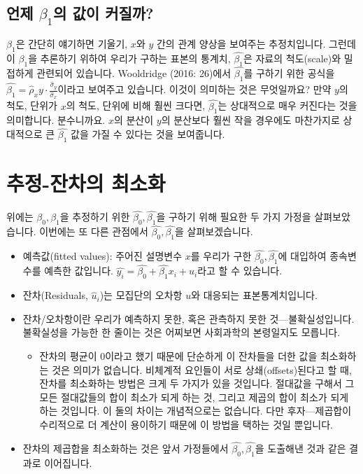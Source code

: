 \documentclass[
]{book}
\providecommand{\tightlist}{%
  \setlength{\itemsep}{0pt}\setlength{\parskip}{0pt}}
\begin{document}
\hypertarget{uxc5b8uxc81c-beta_1uxc758-uxac12uxc774-uxcee4uxc9c8uxae4c}{%
\subsection{\texorpdfstring{언제 \(\beta_1\)의 값이 커질까?}{언제 \textbackslash beta\_1의 값이 커질까?}}\label{uxc5b8uxc81c-beta_1uxc758-uxac12uxc774-uxcee4uxc9c8uxae4c}}

\(\beta_1\)은 간단히 얘기하면 기울기, \(x\)와 \(y\) 간의 관계 양상을 보여주는 추정치입니다. 그런데 이 \(\beta_1\)을 추론하기 위하여 우리가 구하는 표본의 통계치, \(\hat{\beta_1}\)은 자료의 척도(scale)와 밀접하게 관련되어 있습니다. Wooldridge (2016: 26)에서 \(\hat{\beta_1}\)를 구하기 위한 공식을 \(\hat{\beta_1} = \hat{\rho}_xy\cdot \frac{\hat{\sigma}_y}{\hat{\sigma}_x}\)이라고 보여주고 있습니다. 이것이 의미하는 것은 무엇일까요? 만약 \(y\)의 척도, 단위가 \(x\)의 척도, 단위에 비해 훨씬 크다면, \(\hat{\beta_1}\)는 상대적으로 매우 커진다는 것을 의미합니다. 분수니까요. \(x\)의 분산이 \(y\)의 분산보다 훨씬 작을 경우에도 마찬가지로 상대적으로 큰 \(\hat{\beta_1}\) 값을 가질 수 있다는 것을 보여줍니다.

\hypertarget{uxcd94uxc815-uxc794uxcc28uxc758-uxcd5cuxc18cuxd654}{%
\section{추정-잔차의 최소화}\label{uxcd94uxc815-uxc794uxcc28uxc758-uxcd5cuxc18cuxd654}}

위에는 \(\beta_0, \beta_1\)을 추정하기 위한 \(\hat{\beta_0}, \hat{\beta_1}\)을 구하기 위해 필요한 두 가지 가정을 살펴보았습니다. 이번에는 또 다른 관점에서 \(\hat{\beta_0}, \hat{\beta_1}\)을 살펴보겠습니다.

\begin{itemize}
\item
  예측값(fitted values): 주어진 설명변수 \(x\)를 우리가 구한 \(\hat{\beta_0}, \hat{\beta_1}\)에 대입하여 종속변수를 예측한 값입니다. \(\hat{y_i} = \hat{\beta_0} + \hat{\beta_1}x_i + \hat{u}_i\)라고 할 수 있습니다.
\item
  잔차(Residuals, \(\hat{u}_i\))는 모집단의 오차항 \(u\)와 대응되는 표본통계치입니다.
\item
  잔차/오차항이란 우리가 예측하지 못한, 혹은 관측하지 못한 것---불확실성입니다. 불확실성을 가능한 한 줄이는 것은 어찌보면 사회과학의 본령일지도 모릅니다.

  \begin{itemize}
  \tightlist
  \item
    잔차의 평균이 0이라고 했기 때문에 단순하게 이 잔차들을 더한 값을 최소화하는 것은 의미가 없습니다. 비체계적 요인들이 서로 상쇄(offsets)된다고 할 때, 잔차를 최소화하는 방법은 크게 두 가지가 있을 것입니다. 절대값을 구해서 그 모든 절대값들의 합이 최소가 되게 하는 것, 그리고 제곱의 합이 최소가 되게 하는 것입니다. 이 둘의 차이는 개념적으로는 없습니다. 다만 후자---제곱합이 수리적으로 더 계산이 용이하기 때문에 이 방법을 택하는 것일 뿐입니다.
  \end{itemize}
\item
  잔차의 제곱합을 최소화하는 것은 앞서 가정들에서 \(\hat{\beta_0}, \hat{\beta_1}\)을 도출해낸 것과 같은 결과로 이어집니다.
\end{itemize}
\end{document}
